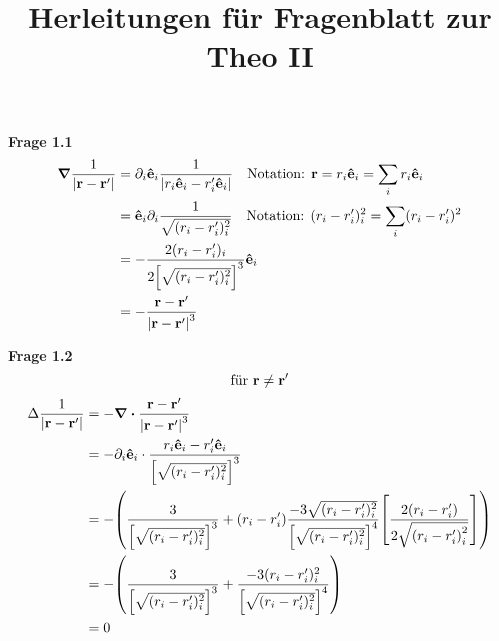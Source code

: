 
\title{Herleitungen für Fragenblatt zur Theo II}

   
  \newpage

  \textbf{Frage 1.1}
  \begin{equation*}
    \begin{split}
      \grad \frac{1}{\abs{\vb{r}-\vb{r}'}} 
        &= \partial_i \vu e_i \frac{1}{\abs{r_i \vu e_i - r_i' \vu e_i}}
        \quad\text{Notation: } \vb r = r_i \vu e_i = \sum_i r_i \vu e_i\\
        &= \vu e_i \partial_i \frac{1}{\sqrt{(r_i-r_i')_i^2}}
        \quad\text{Notation: }(r_i-r'_i)^2_i=\sum_i(r_i-r'_i)^2\\
        &= 
        -\frac{2(r_i-r_i')_i}{2\qty[\sqrt{(r_i-r_i')_i^2}]^{3}}\vu e_i \\
        &= -\frac{\vb r - \vb r'}{\abs{\vb r - \vb r'}^3} 
    \end{split}
  \end{equation*}

  \textbf{Frage 1.2}
  \begin{equation*}
    \text{für } \vb r \neq \vb r'
  \end{equation*}
  \begin{equation*}
    \begin{split}
      \Delta \frac{1}{\abs{\vb{r}-\vb{r}'}}
      &=-\div\frac{\vb r - \vb r'}{\abs{\vb r - \vb r'}^3}\\  
      &=-\partial_i \vu e_i \cdot 
      \frac{r_i \vu e_i - r'_i \vu e_i}
      {\qty[\sqrt{(r_i - r'_i)_i^2}]^3}\\  
      &=-\qty(
      \frac{3}{\qty[\sqrt{(r_i - r'_i)_i^2}]^3}
      +(r_i-r'_i)\frac{-3\sqrt{(r_i-r'_i)_i^2}}
      {{\qty[\sqrt{(r_i-r'_i)_i^2}]}^4}
      \qty[\frac{2(r_i-r_i')}{2\sqrt{{(r_i-r'_i)}_i^2}}]
      )\\  
      &=-\qty(
      \frac{3}{\qty[\sqrt{(r_i-r'_i)_i^2}]^3} 
      + \frac{-3(r_i-r'_i)_i^2}{\qty[\sqrt{(r_i-r'_i)_i^2}]^4}
      )\\
      &=0
    \end{split}
  \end{equation*}


